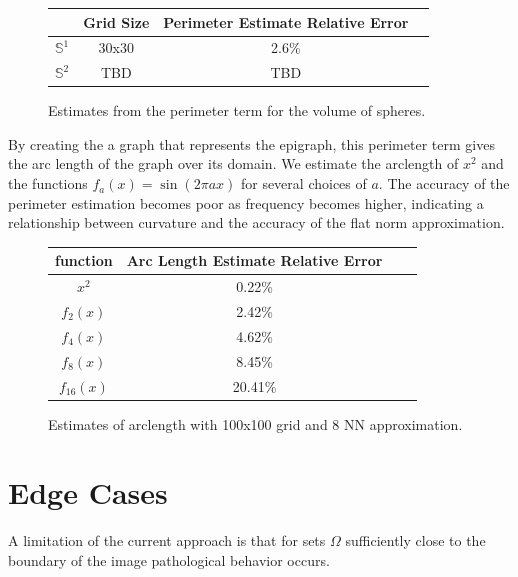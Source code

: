 \documentclass[12pt]{article}
\begin{document}
\begin{figure}[H]
	\centering
	\begin{tabular}{|c|c|c|c|}
		\hline
		&  Grid Size & Perimeter Estimate Relative Error  \\
		\hline
		$\mathbb{S}^1$ & 30x30 &  2.6\%  \\
		\hline
		$\mathbb{S}^2$ & TBD & TBD    \\
		\hline
	\end{tabular}
	\caption{Estimates from the perimeter term for the volume of spheres.}
\end{figure}

By creating the a graph that represents the epigraph, this perimeter term gives the arc length of the graph over its domain. We estimate the arclength of $x^2$ and the functions $f_a(x) = \sin(2\pi ax)$ for several choices of $a$. The accuracy of the perimeter estimation becomes poor as frequency becomes higher, indicating a relationship between curvature and the accuracy of the flat norm approximation.

\begin{figure}[H]
	\centering
	\begin{tabular}{|c|c|c|c|}
		\hline
		function & Arc Length Estimate Relative Error  \\
		\hline
		$x^2$   &  0.22\%  \\
		\hline
		$f_{2}(x)$  & 2.42\%    \\
		\hline
		$f_{4}(x)$  & 4.62\%    \\
		\hline
		$f_{8}(x)$  & 8.45\%    \\
		\hline
		$f_{16}(x)$  & 20.41\%    \\
		\hline
	\end{tabular}
	\caption{Estimates of arclength with 100x100 grid and 8 NN approximation.}
\end{figure}

\section{Edge Cases}

A limitation of the current approach is that for sets $\Omega$ sufficiently close to the boundary of the image pathological behavior occurs.



\end{document}

